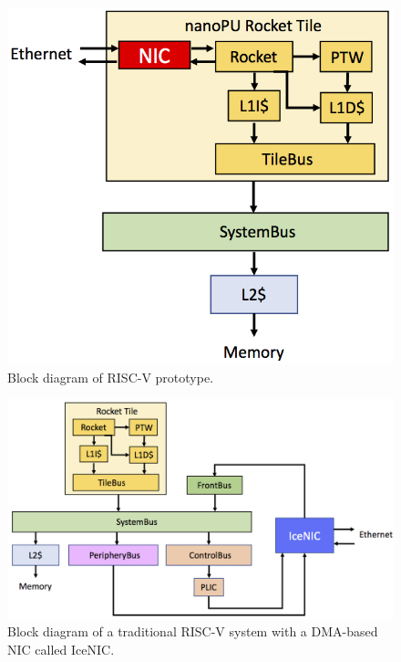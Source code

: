 \begin{figure}
  \includegraphics[width=0.75\linewidth]{./figures/nanoPU-prototype}
  \caption{Block diagram of \name{} RISC-V prototype.}
  \label{fig:nanoPU-prototype}
\end{figure}

\begin{figure}
    \includegraphics[width=\linewidth]{./figures/icenic-prototype}
    \caption{Block diagram of a traditional RISC-V system with a DMA-based NIC called IceNIC.}
    \label{fig:icenic-prototype}
\end{figure}